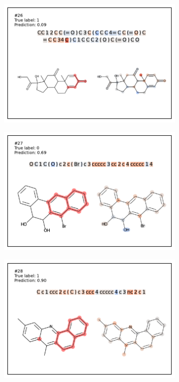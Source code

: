 \begin{figure}
\begin{subfigure}[b]{0.33\textwidth}
\end{subfigure} 
\begin{subfigure}[b]{0.33\textwidth} 
  \centering 
  \includegraphics[width=\textwidth]{figures/ames/ames26.pdf} 
\end{subfigure}\begin{subfigure}[b]{0.33\textwidth} 
  \centering 
  \includegraphics[width=\textwidth]{figures/ames/ames27.pdf} 
\end{subfigure}\begin{subfigure}[b]{0.33\textwidth} 
  \centering 
  \includegraphics[width=\textwidth]{figures/ames/ames28.pdf} 

\end{subfigure}
\end{figure}
